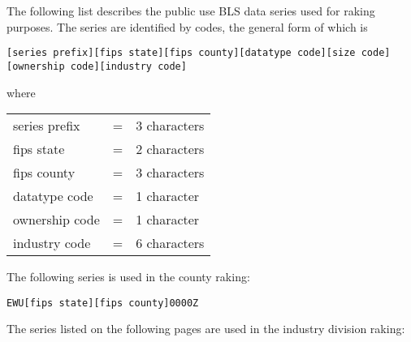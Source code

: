 
%
%

The following list describes the public use BLS data series used for raking 
purposes. The series are identified by codes, the general form of which is


\begin{center}
\tt [series prefix][fips state][fips county][datatype code][size code][ownership code][industry code]
\end{center}

where

\begin{tabular}{lcl}

series prefix  &=& 3 characters\\
fips state     &=& 2 characters\\
fips county    &=& 3 characters\\
datatype code  &=& 1 character \\
ownership code &=& 1 character \\
industry code  &=& 6 characters\\

\end{tabular}

The following series is used in the county raking:

\begin{center}
\tt EWU[fips state][fips county]0000Z
\end{center}


The series listed on the following pages are used in the industry division raking:
\tablehead{\hline}
\tabletail{\hline}
\twocolumn

